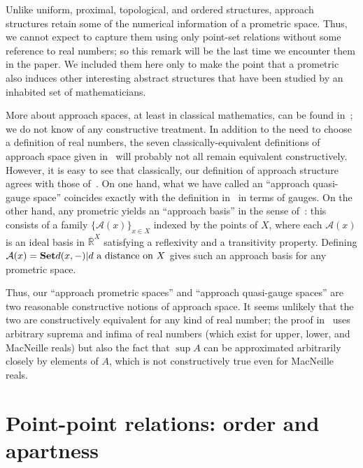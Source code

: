 \documentclass{article}
\def\R{\mathbb{R}}
\def\Re{\overline{\R}}
\begin{document}
\begin{rmk}
  Unlike uniform, proximal, topological, and ordered structures, approach structures retain some of the numerical information of a prometric space.
  Thus, we cannot expect to capture them using only point-set relations without some reference to real numbers; so this remark will be the last time we encounter them in the paper.
  We included them here only to make the point that a prometric also induces other interesting abstract structures that have been studied by an inhabited set of mathematicians.

  More about approach spaces, at least in classical mathematics, can be found in~\cite{approach}; we do not know of any constructive treatment.
  In addition to the need to choose a definition of real numbers, the seven classically-equivalent definitions of approach space given in~\cite{approach} will probably not all remain equivalent constructively.
  However, it is easy to see that classically, our definition of approach structure agrees with those of~\cite{approach}.
  On one hand, what we have called an ``approach quasi-gauge space'' coincides exactly with the definition in~\cite{approach} in terms of gauges.
  On the other hand, any prometric yields an ``approach basis'' in the sense of~\cite{approach}: this consists of a family $\{\mathcal{A}(x)\}_{x\in X}$ indexed by the points of $X$, where each $\mathcal{A}(x)$ is an ideal basis in $\Re^X$ satisfying a reflexivity and a transitivity property.
  Defining $\mathcal{A}(x) = \setof{ d(x,-) | d \text{ a distance on } X }$ gives such an approach basis for any prometric space.

  Thus, our ``approach prometric spaces'' and ``approach quasi-gauge spaces'' are two reasonable constructive notions of approach space.
  It seems unlikely that the two are constructively equivalent for any kind of real number; the proof in~\cite{approach} uses arbitrary suprema and infima of real numbers (which exist for upper, lower, and MacNeille reals) but also the fact that $\sup A$ can be approximated arbitrarily closely by elements of $A$, which is not constructively true even for MacNeille reals.
\end{rmk}


\section{Point-point relations: order and apartness}
\label{sec:point-point}
\label{sec:order}
\end{document}
